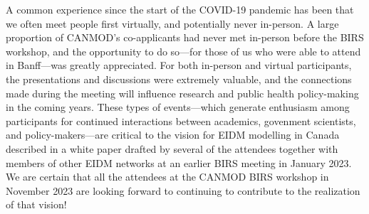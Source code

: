 A common experience since the start of the COVID-19 pandemic has been
that we often meet people first virtually, and potentially never
in-person.  A large proportion of CANMOD's co-applicants had never met
in-person before the BIRS workshop, and the opportunity to do so---for
those of us who were able to attend in Banff---was greatly
appreciated.  For both in-person and virtual participants, the
presentations and discussions were extremely valuable, and the
connections made during the meeting will influence research and public
health policy-making in the coming years.  These types of
events---which generate enthusiasm among participants for continued
interactions between academics, govenment scientists, and
policy-makers---are critical to the vision for EIDM modelling in Canada
described in a white paper \cite{Lewi+23} drafted by several of the
attendees together with members of other EIDM networks at an earlier
BIRS meeting in January 2023.  We are certain that all the attendees
at the CANMOD BIRS workshop in November 2023 are looking forward to
continuing to contribute to the realization of that vision!

